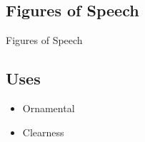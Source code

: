 \documentclass[12pt]{article}
\begin{document}
\maketitle
\pagebreak

\tableofcontents





%
%







%
%
\pagebreak
\vspace*{\fill}
\begin{center}
\section{Figures of Speech}
Figures of Speech
\end{center}
\vspace*{\fill}
\pagebreak

\subsection{Uses}
\begin{itemize}
\item Ornamental 
\item Clearness
\end{itemize}
\end{document}
